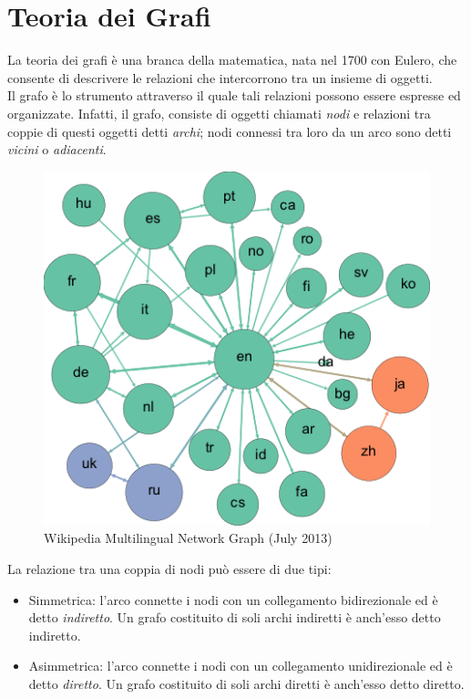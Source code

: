 \section{Teoria dei Grafi}
La teoria dei grafi è una branca della matematica, nata nel 1700 con Eulero, che consente di descrivere le relazioni che intercorrono tra un insieme di oggetti.\\
Il grafo è lo strumento attraverso il quale tali relazioni possono essere espresse ed organizzate. Infatti, il grafo, consiste di oggetti chiamati \textit{nodi} e relazioni tra coppie di questi oggetti detti \textit{archi}; nodi connessi tra loro da un arco sono detti \textit{vicini} o \textit{adiacenti}.\\

\begin{figure}[h!]
	\centering
	\includegraphics[scale=.5]{img/Wikipedia_multilingual_network_graph_July_2013.png}
	\caption{Wikipedia Multilingual Network Graph (July 2013)}
\end{figure}
\newpage
La relazione tra una coppia di nodi può essere di due tipi:
\begin{itemize}
	\item Simmetrica: l'arco connette i nodi con un collegamento bidirezionale ed è detto \textit{indiretto}. Un grafo costituito di soli archi indiretti è anch'esso detto indiretto.
	\item Asimmetrica: l'arco connette i nodi con un collegamento unidirezionale ed è detto \textit{diretto}. Un grafo costituito di soli archi diretti è anch'esso detto diretto.
\end{itemize}
